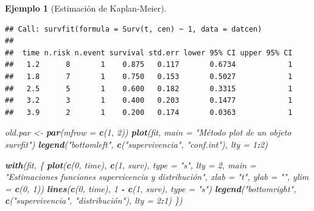 \documentclass[
]{book}
\newenvironment{Shaded}{\begin{snugshade}}{\end{snugshade}}
\newcommand{\AttributeTok}[1]{\textcolor[rgb]{0.13,0.29,0.53}{#1}}
\newcommand{\DecValTok}[1]{\textcolor[rgb]{0.00,0.00,0.81}{#1}}
\newcommand{\FunctionTok}[1]{\textcolor[rgb]{0.13,0.29,0.53}{\textbf{#1}}}
\newcommand{\NormalTok}[1]{#1}
\newcommand{\OtherTok}[1]{\textcolor[rgb]{0.56,0.35,0.01}{#1}}
\newcommand{\SpecialCharTok}[1]{\textcolor[rgb]{0.81,0.36,0.00}{\textbf{#1}}}
\newcommand{\StringTok}[1]{\textcolor[rgb]{0.31,0.60,0.02}{#1}}
\theoremstyle{break}
\newtheorem{example}{Ejemplo}[chapter]
\theoremstyle{nonumberplain}
\begin{document}
\begin{example}[Estimación de Kaplan-Meier]
\begin{verbatim}
## Call: survfit(formula = Surv(t, cen) ~ 1, data = datcen)
## 
##  time n.risk n.event survival std.err lower 95% CI upper 95% CI
##   1.2      8       1    0.875   0.117       0.6734            1
##   1.8      7       1    0.750   0.153       0.5027            1
##   2.5      5       1    0.600   0.182       0.3315            1
##   3.2      3       1    0.400   0.203       0.1477            1
##   3.9      2       1    0.200   0.174       0.0363            1
\end{verbatim}

\begin{Shaded}
\begin{Highlighting}[]
\NormalTok{old.par }\OtherTok{\textless{}{-}} \FunctionTok{par}\NormalTok{(}\AttributeTok{mfrow =} \FunctionTok{c}\NormalTok{(}\DecValTok{1}\NormalTok{, }\DecValTok{2}\NormalTok{))}
\FunctionTok{plot}\NormalTok{(fit, }\AttributeTok{main =} \StringTok{"Método plot de un objeto \textquotesingle{}survfit\textquotesingle{}"}\NormalTok{)}
\FunctionTok{legend}\NormalTok{(}\StringTok{"bottomleft"}\NormalTok{,  }\FunctionTok{c}\NormalTok{(}\StringTok{"supervivencia"}\NormalTok{, }\StringTok{"conf.int"}\NormalTok{), }\AttributeTok{lty =} \DecValTok{1}\SpecialCharTok{:}\DecValTok{2}\NormalTok{)}

\FunctionTok{with}\NormalTok{(fit, \{}
  \FunctionTok{plot}\NormalTok{(}\FunctionTok{c}\NormalTok{(}\DecValTok{0}\NormalTok{, time), }\FunctionTok{c}\NormalTok{(}\DecValTok{1}\NormalTok{, surv), }\AttributeTok{type =} \StringTok{"s"}\NormalTok{, }\AttributeTok{lty =} \DecValTok{2}\NormalTok{,}
       \AttributeTok{main =} \StringTok{"Estimaciones funciones supervicencia y distribución"}\NormalTok{, }
       \AttributeTok{xlab =} \StringTok{"t"}\NormalTok{, }\AttributeTok{ylab =} \StringTok{""}\NormalTok{, }\AttributeTok{ylim =} \FunctionTok{c}\NormalTok{(}\DecValTok{0}\NormalTok{, }\DecValTok{1}\NormalTok{))}
  \FunctionTok{lines}\NormalTok{(}\FunctionTok{c}\NormalTok{(}\DecValTok{0}\NormalTok{, time), }\DecValTok{1} \SpecialCharTok{{-}} \FunctionTok{c}\NormalTok{(}\DecValTok{1}\NormalTok{, surv), }\AttributeTok{type =} \StringTok{"s"}\NormalTok{)}
  \FunctionTok{legend}\NormalTok{(}\StringTok{"bottomright"}\NormalTok{,  }\FunctionTok{c}\NormalTok{(}\StringTok{"supervivencia"}\NormalTok{, }\StringTok{"distribución"}\NormalTok{), }\AttributeTok{lty =} \DecValTok{2}\SpecialCharTok{:}\DecValTok{1}\NormalTok{)}
\NormalTok{\})}
\end{Highlighting}
\end{Shaded}


\end{example}
\end{document}
